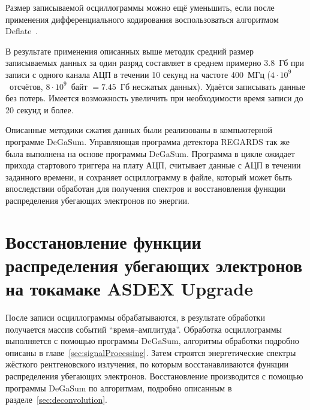 Размер записываемой осциллограммы можно ещё уменьшить, если после применения дифференциального кодирования воспользоваться алгоритмом Deflate~\cite{RFC1951}. 

В результате применения описанных выше методик средний размер записываемых данных за один разряд составляет в среднем примерно 3.8~Гб при записи с одного канала АЦП в течении 10 секунд на частоте 400~МГц ($4\cdot10^9$~отсчётов, $8\cdot10^9$~байт $ = 7.45$~Гб несжатых данных). Удаётся записывать данные без потерь. Имеется возможность увеличить при необходимости время записи до 20 секунд и более.~\cite{Shevelev2021}

Описанные методики сжатия данных были реализованы в компьютерной программе DeGaSum. Управляющая программа детектора REGARDS так же была выполнена на основе программы DeGaSum. Программа в цикле ожидает прихода стартового триггера на плату АЦП, считывает данные с АЦП в течении заданного времени, и сохраняет осциллограмму в файле, который может быть впоследствии обработан для получения спектров и восстановления функции распределения убегающих электронов по энергии.


\section{Восстановление функции распределения убегающих электронов на токамаке ASDEX Upgrade}

После записи осциллограммы обрабатываются, в результате обработки получается массив событий ``время--амплитуда''. Обработка осциллограммы выполняется с помощью программы DeGaSum, алгоритмы обработки подробно описаны в главе~\ref{sec:signalProcessing}. Затем строятся энергетические спектры жёсткого рентгеновского излучения, по которым восстанавливаются функции распределения убегающих электронов. Восстановление производится с помощью программы DeGaSum по алгоритмам, подробно описанным в разделе~\ref{sec:deconvolution}.~\cite{Shevelev2021}

